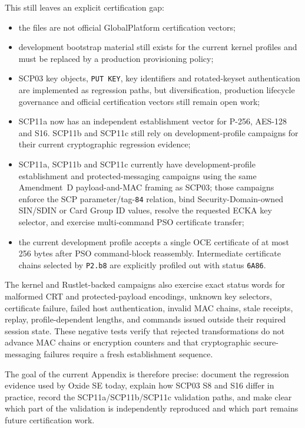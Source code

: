 This still leaves an explicit certification gap:
\begin{itemize}
\item the files are not official GlobalPlatform certification vectors;
\item development bootstrap material still exists for the current kernel
      profiles and must be replaced by a production provisioning policy;
\item SCP03 key objects, \texttt{PUT KEY}, key identifiers and rotated-keyset
      authentication are implemented as regression paths, but diversification,
      production lifecycle governance and official certification vectors still
      remain open work;
\item SCP11a now has an independent establishment vector for P-256, AES-128
      and S16. SCP11b and SCP11c still rely on development-profile campaigns
      for their current cryptographic regression evidence;
\item SCP11a, SCP11b and SCP11c currently have development-profile
      establishment and protected-messaging campaigns using the same
      Amendment~D payload-and-MAC framing as SCP03; those
      campaigns enforce the SCP parameter/tag-\texttt{84} relation, bind
      Security-Domain-owned SIN/SDIN or Card Group ID values, resolve the
      requested ECKA key selector, and exercise multi-command PSO certificate
      transfer;
\item the current development profile accepts a single OCE certificate of at
      most 256 bytes after PSO command-block reassembly.  Intermediate
      certificate chains selected by \texttt{P2.b8} are explicitly profiled
      out with status \texttt{6A86}.
\end{itemize}

The kernel and Rustlet-backed campaigns also exercise exact status words for
malformed CRT and protected-payload encodings, unknown key selectors, certificate failure,
failed host authentication, invalid MAC chains, stale receipts, replay,
profile-dependent lengths, and commands issued outside their required session
state. These negative tests verify that rejected transformations do not advance
MAC chains or encryption counters and that cryptographic secure-messaging
failures require a fresh establishment sequence.

The goal of the current Appendix is therefore precise: document the regression
evidence used by Oxide SE today, explain how SCP03 S8 and S16 differ in
practice, record the SCP11a/SCP11b/SCP11c validation paths, and make clear which part of
the validation is independently reproduced and which part remains future
certification work.
